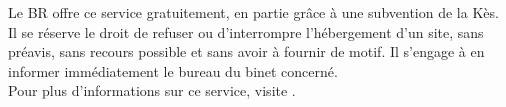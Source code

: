 Le BR offre ce service gratuitement, en partie grâce à une subvention de la Kès.
Il se réserve le droit de refuser ou d'interrompre l'hébergement d'un site, sans préavis, sans recours possible et sans avoir à fournir de motif.
Il s'engage à en informer immédiatement le bureau du binet concerné.\\
Pour plus d'informations sur ce service, visite .

